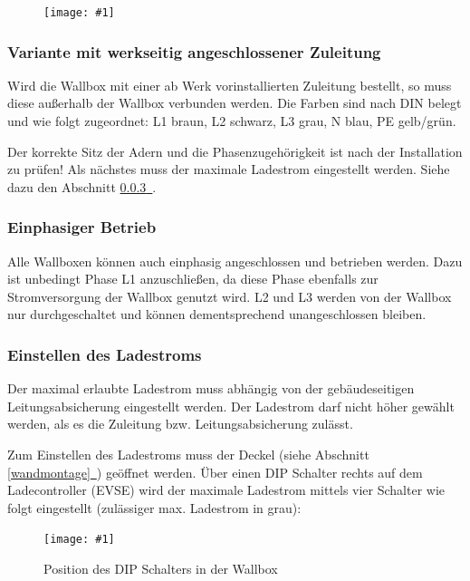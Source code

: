 \documentclass[a4paper,10pt]{article}
\newcommand{\gfx}[1]{\texttt{[image: \#1]}}
\newcommand*{\fullref}[1]{Abschnitt \hyperref[{#1}]{\ref*{#1}~\nameref*{#1}}}
\begin{document}
\begin{multicols*}{2}
    \begin{figure}[H]
        \gfx{./img_warp3/resized/warp3_back.jpg}
    \end{figure}

    \subsubsection{Variante mit werkseitig angeschlossener Zuleitung}
    Wird die Wallbox mit einer ab Werk vorinstallierten Zuleitung bestellt, so
    muss diese außerhalb der Wallbox verbunden werden. Die Farben sind nach DIN belegt und wie
    folgt zugeordnet: L1 braun, L2 schwarz, L3 grau, N blau, PE gelb/grün.

    Der korrekte Sitz der Adern und die Phasenzugehörigkeit ist nach der
    Installation zu prüfen! 
    Als nächstes muss der maximale Ladestrom eingestellt werden. Siehe dazu den
	\fullref{ladestrom_schalter}.



    \subsubsection{Einphasiger Betrieb}
    Alle Wallboxen können auch einphasig angeschlossen und betrieben werden.
    Dazu ist unbedingt Phase L1 anzuschließen, da diese Phase ebenfalls zur
    Stromversorgung der Wallbox genutzt wird. L2 und L3 werden von der Wallbox
    nur durchgeschaltet und können dementsprechend unangeschlossen bleiben.

    \subsubsection{Einstellen des Ladestroms}\label{ladestrom_schalter}
    Der maximal erlaubte Ladestrom muss abhängig von der gebäudeseitigen
    Leitungsabsicherung eingestellt werden. Der Ladestrom darf nicht höher gewählt
    werden, als es die Zuleitung bzw. Leitungsabsicherung zulässt.

    Zum Einstellen des Ladestroms muss der Deckel (siehe \fullref{wandmontage})
    geöffnet werden. Über einen DIP Schalter rechts auf dem Ladecontroller (EVSE) wird der
    maximale Ladestrom mittels vier Schalter wie folgt eingestellt (zulässiger max. Ladestrom in grau):

    \begin{figure}[H]
    	\gfx{./img_warp3/resized/warp3_switch_location.jpg}
        \caption*{Position des DIP Schalters in der Wallbox}
    \end{figure}


\end{multicols*}
\end{document}
